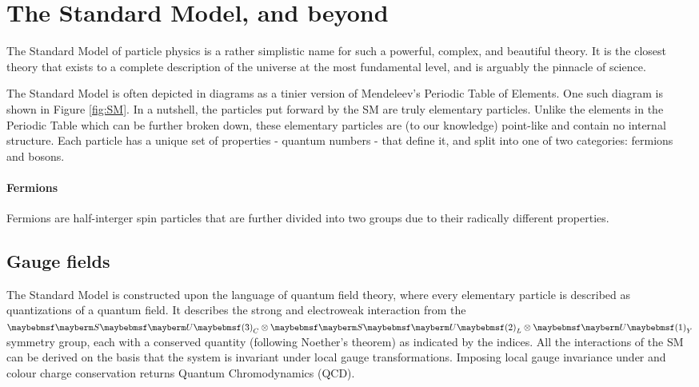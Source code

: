 
\chapter{The Standard Model, and beyond}
\label{chap:theory}

The Standard Model of particle physics is a rather simplistic name for such a powerful, complex, and beautiful theory. It is the closest theory that exists to a complete description of the universe at the most fundamental level, and is arguably the pinnacle of science. 

The Standard Model is often depicted in diagrams as a tinier version of Mendeleev's Periodic Table of Elements. One such diagram is shown in Figure \ref{fig:SM}. In a nutshell, the particles put forward by the SM are truly elementary particles. Unlike the elements in the Periodic Table which can be further broken down, these elementary particles are (to our knowledge) point-like and contain no internal structure. Each particle has a unique set of properties - quantum numbers - that define it, and split into one of two categories: fermions and bosons. 

\subsubsection{Fermions}

Fermions are half-interger spin particles that are further divided into two groups due to their radically different properties. 
\section{Gauge fields}

The Standard Model is constructed upon the language of quantum field theory, where every elementary particle is described as quantizations  of a quantum field. It describes the strong and electroweak interaction from the $\SUgroup3_C\otimes\SUgroup2_L\otimes\Ugroup1_Y$ symmetry group, each with a conserved quantity (following Noether's theorem) as indicated by the indices. All the interactions of the SM can be derived on the basis that the system is invariant under local gauge transformations. Imposing local gauge invariance under  and colour charge conservation returns Quantum Chromodynamics (QCD). 

